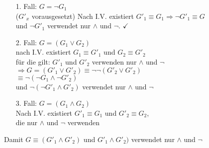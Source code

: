 \documentclass[a4paper]{scrartcl}
\begin{document}
\begin{enumerate}
\item[1. Fall:] $G = \neg G_1$\\
($G'_x$ vorausgesetzt) Nach I.V. existiert $G'_1 \equiv G_1 \Rightarrow \neg G'_1 \equiv G$\\
und $\neg G'_1$ verwendet nur $\wedge$ und $\neg$. $\checkmark$

\item[2. Fall:] $G = (G_1 \vee G_2)$\\
nach I.V. existiert $G_1 \equiv G'_1$ und $G_2 \equiv G'_2$\\
für die gilt: $G'_1$ und $G'_2$ verwenden nur $\wedge$ und $\neg$\\
$\Rightarrow G = (G'_1 \vee G'_2) \equiv \neg \neg (G'_2 \vee G'_2)$\\
$\equiv \neg ( \neg G_1 \wedge \neg G'_2)$\\
und $\neg ( \neg G'_1 \wedge G'_2)$ verwendet nur $\wedge$ und $\neg$

\item[3. Fall:] $G = (G_1 \wedge G_2)$\\
Nach I.V. existiert $G'_1 \equiv G_1$ und $G'_2 \equiv G_2$,\\
die nur $\wedge$ und $\neg$ verwenden
\end{enumerate}

Damit $G \equiv (G'_1 \wedge G'_2)$ und $G'_1 \wedge G'_2)$ verwendet nur $\wedge$ und $\neg$
\end{document}
